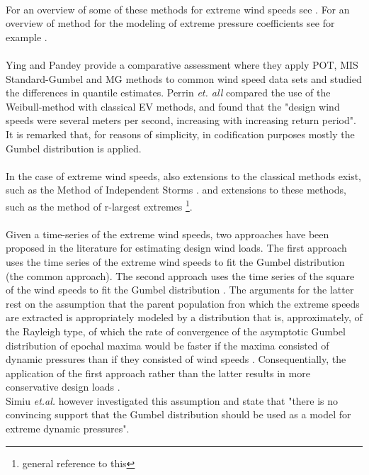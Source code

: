\begin{framed}
\\
For an overview of some of these methods for extreme wind speeds see \cite{Palutikof_1999}. For an overview of method for the modeling of extreme pressure coefficients see for example \cite{Peng201411}. \\
\\
Ying and Pandey \cite{Ying_2005} provide a comparative assessment where they apply POT, MIS Standard-Gumbel and MG methods to common wind speed data sets and studied the differences in quantile estimates. Perrin \textit{et. all} \cite{Perrin_2006} compared the use of the Weibull-method with classical EV methods, and found that the "design wind speeds were several meters per second, increasing with increasing return period".  It is remarked that, for reasons of simplicity, in codification purposes mostly the Gumbel distribution is applied. \\
\\
In the case of extreme wind speeds, also extensions to the classical methods exist, such as the Method of Independent Storms \cite{Cookbook, Harris_1999}. 
and extensions to these methods, such as the method of r-largest extremes \footnote{general reference to this}\cite{Twan_1988}.\\ 
\\
Given a time-series of the extreme wind speeds, two approaches have been proposed in the literature for estimating design wind loads. The first approach uses the time series of the extreme wind speeds to fit the Gumbel distribution (the common approach). The second approach uses the time series of the square of the wind speeds to fit the Gumbel distribution \cite[297]{Cook_1985}  \cite[254 and 256]{Naess_date} \cite{Harris_1996}. The arguments for the latter rest on the assumption that the parent population fron which the extreme speeds are extracted is appropriately modeled by a distribution that is, approximately, of the Rayleigh type, of which the rate of convergence of the asymptotic Gumbel distribution of epochal maxima would be faster if the maxima consisted of dynamic pressures than if they consisted of wind speeds \cite[297]{Cook_1985} . Consequentially, the application of the first approach rather than the latter results in more conservative design loads \cite[297]{Cook_1985}. \\
Simiu \textit{et.al.} \cite{Simiu_2001} however investigated this assumption and state that "there is no convincing support that the Gumbel distribution should be used as a model for extreme dynamic pressures".  
\end{framed}

